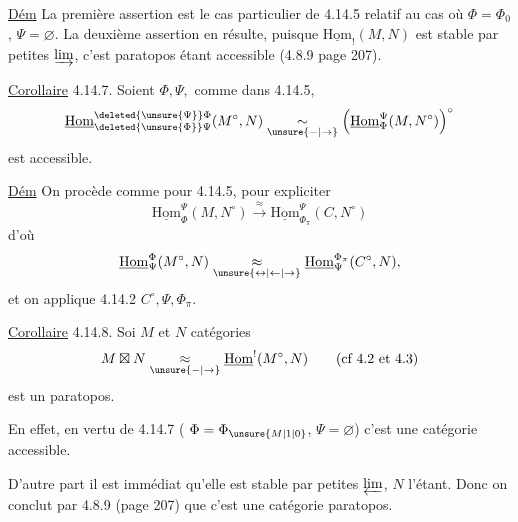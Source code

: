 \uline{Dém} La première assertion est le cas particulier de 4.14.5 relatif au cas où $\Phi=\Phi_0$, $\Psi=\varnothing$. La deuxième assertion en résulte, puisque $\underline{\mathrm{Hom}}_!(M,N)$ est  stable par petites $\varinjlim$,  c'est  paratopos étant accessible (4.8.9 page 207).

\uline{Corollaire} 4.14.7. Soient $\Phi,\Psi,$ comme dans 4.14.5,  
\[
\underline{\mathrm{Hom}}_{\deleted{\unsure{\Phi}}\Psi}^{\deleted{\unsure{\Psi}}\Phi}(M^\circ,N)
\underset{\unsure{-|\to}}{\sim}
\left(\underline{\mathrm{Hom}}_{\Phi}^{\Psi}(M,N^\circ)\right)^\circ
\]
est accessible.

\uline{Dém} On procède comme pour 4.14.5, pour expliciter
\[
\underline{\mathrm{Hom}}_{\Phi}^{\Psi}(M,N^\circ)\xrightarrow{\approx}
\underline{\mathrm{Hom}}_{\Phi_\pi}^{\Psi}(C,N^\circ)
\]
d'où
\[
\underline{\mathrm{Hom}}_{\Psi}^{\Phi}(M^\circ,N)
\underset{\unsure{\leftrightarrow|\leftarrow|\to}}{\approx}
\underline{\mathrm{Hom}}_{\Psi}^{\Phi_\pi}(C^\circ,N),
\]
et on applique 4.14.2  $C^\circ,\Psi,\Phi_\pi$.

\uline{Corollaire} 4.14.8. Soi $M$ et $N$  catégories  
\[
M\boxtimes N\underset{\unsure{-|\to}}{\approx}\underline{\mathrm{Hom}}^!(M^\circ,N)
\qquad\text{(cf 4.2 et 4.3)}
\]
est un paratopos.

En effet, en vertu de 4.14.7 ( $\Phi=\Phi_{\unsure{M|1|0}}$, $\Psi=\varnothing$) c'est une catégorie accessible.

D'autre part il est immédiat qu'elle est stable par petites $\varprojlim$, $N$ l'étant. Donc on conclut   par 4.8.9 (page 207) que c'est une catégorie paratopos.

